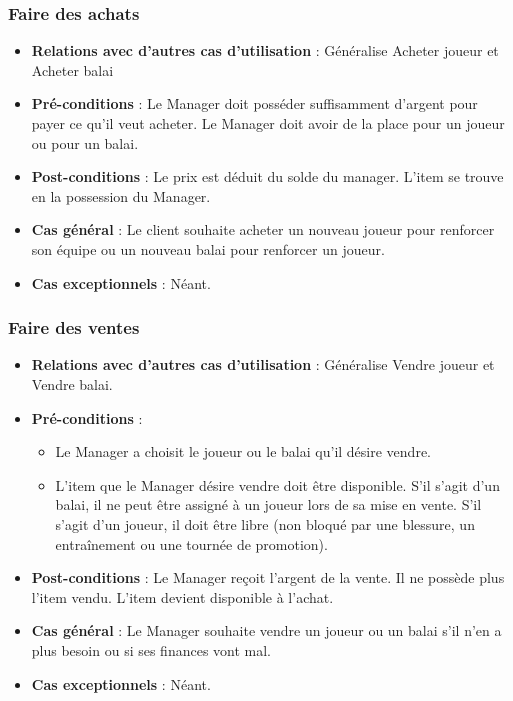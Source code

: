 \documentclass[a4paper,titlepage]{scrreprt}
\begin{document}
    \subsubsection{Faire des achats}
      \begin{itemize}
        \item \textbf{Relations avec d'autres cas d'utilisation}  : Généralise Acheter joueur et Acheter balai
        \item \textbf{Pré-conditions} : Le Manager doit posséder suffisamment d’argent pour payer ce qu’il veut acheter. Le Manager doit avoir de la place pour un joueur ou pour un balai.
        \item \textbf{Post-conditions} : Le prix est déduit du solde du manager. L'item se trouve en la possession du Manager.
        \item \textbf{Cas général} : Le client souhaite acheter un nouveau joueur pour renforcer son équipe ou un nouveau balai pour renforcer un joueur.
        \item \textbf{Cas exceptionnels} : Néant.
      \end{itemize}
    \subsubsection{Faire des ventes}
      \begin{itemize}
        \item \textbf{Relations avec d'autres cas d'utilisation}  : Généralise Vendre joueur et Vendre balai.
        \item \textbf{Pré-conditions} :
        \begin{itemize}
            \item Le Manager a choisit le joueur ou le balai qu'il désire vendre.
            \item L'item que le Manager désire vendre doit être disponible. S'il s'agit d'un balai, il ne peut être assigné à un joueur lors de sa mise en vente. S'il s'agit d'un joueur, il doit être libre (non bloqué par une blessure, un entraînement ou une tournée de promotion).
        \end{itemize}    
        \item \textbf{Post-conditions} : Le Manager reçoit l’argent de la vente. Il ne possède plus l'item vendu. L'item devient disponible à l'achat.
        \item \textbf{Cas général} : Le Manager souhaite vendre un joueur ou un balai s’il n’en a plus besoin ou si ses finances vont mal. 
        \item \textbf{Cas exceptionnels} : Néant.
      \end{itemize}
\end{document}

